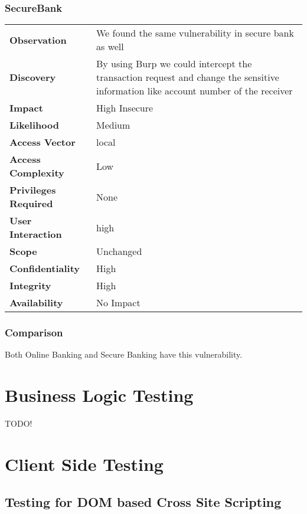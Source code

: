 \subsubsection*{SecureBank}
\begin{tabular}{l|p{10cm}}

\textbf{Observation} & We found the same vulnerability in secure bank as well \\
\textbf{Discovery} & By using Burp we could intercept the transaction request and change the sensitive information like account number of the receiver \\
\textbf{Impact} & High Insecure \\
\textbf{Likelihood} & Medium \\
\textbf{Access Vector} & local \\
\textbf{Access Complexity} & Low \\
\textbf{Privileges Required} & None \\
\textbf{User Interaction} & high \\
\textbf{Scope} & Unchanged \\
\textbf{Confidentiality} & High \\
\textbf{Integrity} & High \\
\textbf{Availability} & No Impact \\
\end{tabular}

\subsubsection*{Comparison}
Both Online Banking and Secure Banking have this vulnerability.
\section{Business Logic Testing}
TODO!

\section{Client Side Testing}
\subsection{Testing for DOM based Cross Site Scripting}

